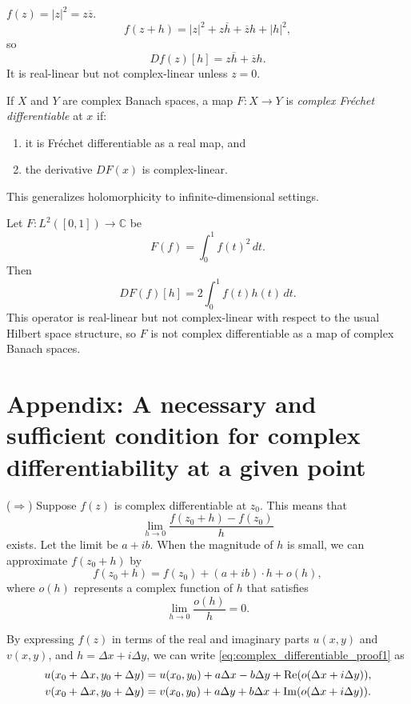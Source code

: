 \begin{example} $f(z)=|z|^2 = z\overline{z}$.
\[
f(z+h) = |z|^2 + z\overline{h} + \overline{z}h + |h|^2,
\]
so
\[
Df(z)[h] = z\overline{h} + \overline{z}h.
\]
It is real-linear but not complex-linear unless $z=0$.
\end{example}

If $X$ and $Y$ are complex Banach spaces, a map $F : X \to Y$ is \emph{complex Fr\'echet differentiable} at $x$ if:

\begin{enumerate}
	\item it is Fréchet differentiable as a real map, and
	\item the derivative $DF(x)$ is complex-linear.
\end{enumerate}

This generalizes holomorphicity to infinite-dimensional settings.

\begin{example} Let $F : L^2([0,1]) \to \mathbb{C}$ be
\[
F(f) = \int_0^1 f(t)^2\,dt.
\]
Then
\[
DF(f)[h] = 2\int_0^1 f(t)h(t)\,dt.
\]
This operator is real-linear but not complex-linear with respect to the usual Hilbert space structure, so $F$ is not complex differentiable as a map of complex Banach spaces.
\end{example}




\section{Appendix: A necessary and sufficient condition for complex differentiability at a given point}



($\Rightarrow$) Suppose $f(z)$ is complex differentiable at $z_0$. This means that
$$
\lim_{h \rightarrow 0} \frac{f(z_0+h)-f(z_0)}{h}
$$
exists. Let the limit be $a+ib$. When the magnitude of $h$ is small, we can approximate $f(z_0+h)$ by
\begin{equation}
f(z_0+h) = f(z_0) + (a+ib)\cdot h + o(h),
\label{eq:complex_differentiable_proof1}
\end{equation}
where $o(h)$ represents a complex function of $h$ that satisfies
$$
\lim_{h\rightarrow 0} \frac{o(h)}{h} = 0.
$$

By expressing $f(z)$ in terms of the real and imaginary parts $u(x,y)$ and $v(x,y)$, and $h=\Delta x + i \Delta y$, we can write \eqref{eq:complex_differentiable_proof1} as
\begin{align*}
	u(x_0+\Delta x, y_0 + \Delta y) &= 
	u(x_0,y_0) + a \Delta x - b \Delta y + \operatorname{\mathrm{Re}}(o(\Delta x + i \Delta y)), \\
	v(x_0+\Delta x, y_0 + \Delta y) &= 
v(x_0,y_0) + a \Delta y + b \Delta x + \operatorname{\mathrm{Im}}(o(\Delta x + i \Delta y)).
\end{align*}

